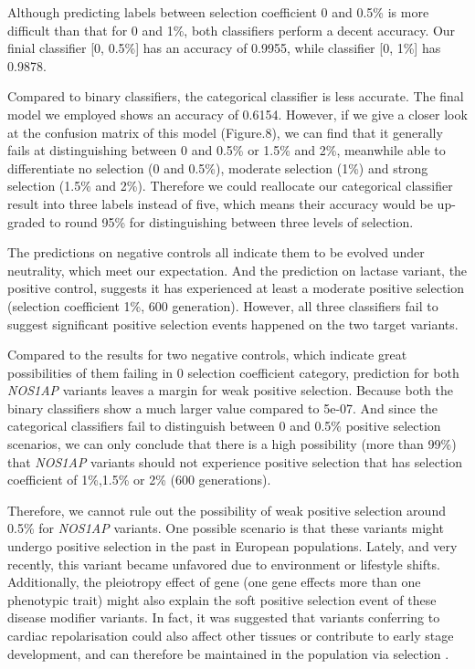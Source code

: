 \documentclass[a4paper,12pt,oneside]{extarticle}
\begin{document}
\par
Although predicting labels between selection coefficient 0 and 0.5\% is more difficult than that for 0 and 1\%, both classifiers perform a decent accuracy. Our finial classifier [0, 0.5\%] has an accuracy of 0.9955, while classifier [0, 1\%] has 0.9878.
\par
Compared to binary classifiers, the categorical classifier is less accurate. The final model we employed shows an accuracy of 0.6154. However, if we give a closer look at the confusion matrix of this model (Figure.8), we can find that it generally fails at distinguishing between 0 and 0.5\% or 1.5\% and 2\%, meanwhile able to differentiate no selection (0 and 0.5\%), moderate selection (1\%) and strong selection (1.5\% and 2\%). Therefore we could reallocate our categorical classifier result into three labels instead of five, which means their accuracy would be up-graded to round 95\% for distinguishing between three levels of selection. 
\par
The predictions on negative controls all indicate them to be evolved under neutrality, which meet our expectation. And the prediction on lactase variant, the positive control, suggests it has experienced at least a moderate positive selection (selection coefficient 1\%, 600 generation). However, all three classifiers fail to suggest significant positive selection events happened on the two target variants.
\par
Compared to the results for two negative controls, which indicate great possibilities of them failing in 0 selection coefficient category, prediction for both \textit{NOS1AP} variants leaves a margin for weak positive selection. Because both the binary classifiers show a much larger value compared to 5e-07. And since the categorical classifiers fail to distinguish between 0 and 0.5\% positive selection scenarios, we can only conclude that there is a high possibility (more than 99\%) that \textit{NOS1AP} variants should not experience positive selection that has selection coefficient of 1\%,1.5\% or 2\% (600 generations). 
\par
Therefore, we cannot rule out the possibility of weak positive selection around 0.5\% for \textit{NOS1AP} variants. One possible scenario is that these variants might undergo positive selection in the past in European populations. Lately, and very recently, this variant became unfavored due to environment or lifestyle shifts. Additionally, the pleiotropy effect of gene (one gene effects more than one phenotypic trait) might also explain the soft positive selection event of these disease modifier variants. In fact, it was suggested that variants conferring to cardiac repolarisation could also affect other tissues or contribute to early stage development, and can therefore be maintained in the population via selection \cite{10}. 
\end{document}
